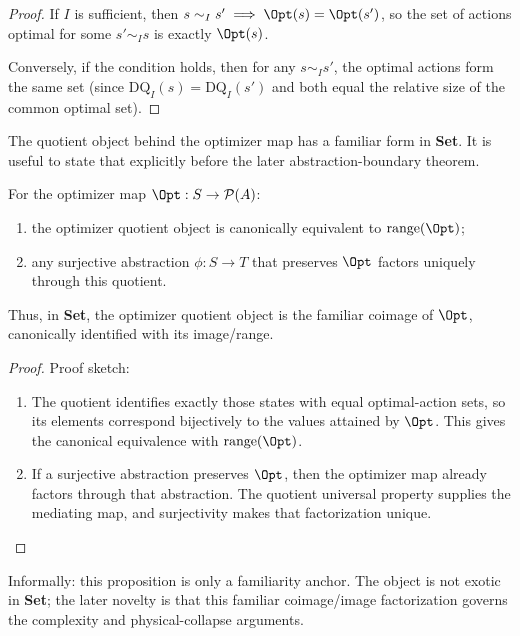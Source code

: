 \begin{proof}
If $I$ is sufficient, then $s \sim_I s' \implies \Opt(s) = \Opt(s')$, so the set of actions optimal for some $s' \sim_I s$ is exactly $\Opt(s)$.

Conversely, if the condition holds, then for any $s \sim_I s'$, the optimal actions form the same set (since $\text{DQ}_I(s) = \text{DQ}_I(s')$ and both equal the relative size of the common optimal set).
\end{proof}

The quotient object behind the optimizer map has a familiar form in \textbf{Set}. It is useful to state that explicitly before the later abstraction-boundary theorem.

\begin{proposition}\label{prop:optimizer-coimage}
For the optimizer map $\Opt : S \to \mathcal{P}(A)$:
\begin{enumerate}
\item the optimizer quotient object is canonically equivalent to $\mathrm{range}(\Opt)$;
\item any surjective abstraction $\phi : S \to T$ that preserves $\Opt$ factors uniquely through this quotient.
\end{enumerate}
Thus, in \textbf{Set}, the optimizer quotient object is the familiar coimage of $\Opt$, canonically identified with its image/range.\cite{maclane1998categories}
\end{proposition}

\begin{proof}
Proof sketch:
\begin{enumerate}
\item The quotient identifies exactly those states with equal optimal-action sets, so its elements correspond bijectively to the values attained by $\Opt$. This gives the canonical equivalence with $\mathrm{range}(\Opt)$.
\item If a surjective abstraction preserves $\Opt$, then the optimizer map already factors through that abstraction. The quotient universal property supplies the mediating map, and surjectivity makes that factorization unique.
\end{enumerate}
\end{proof}

Informally: this proposition is only a familiarity anchor. The object is not exotic in \textbf{Set}; the later novelty is that this familiar coimage/image factorization governs the complexity and physical-collapse arguments.

